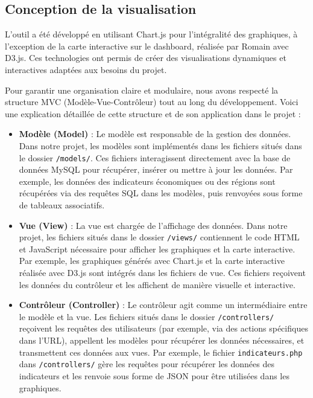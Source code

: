 \documentclass[11pt]{article}
\begin{document}
\subsection{Conception de la visualisation}

L’outil a été développé en utilisant Chart.js pour l'intégralité des graphiques, à l'exception de la carte interactive sur le dashboard, réalisée par Romain avec D3.js. Ces technologies ont permis de créer des visualisations dynamiques et interactives adaptées aux besoins du projet.

Pour garantir une organisation claire et modulaire, nous avons respecté la structure MVC (Modèle-Vue-Contrôleur) tout au long du développement. Voici une explication détaillée de cette structure et de son application dans le projet :

\begin{itemize}
  \item \textbf{Modèle (Model)} : Le modèle est responsable de la gestion des données. Dans notre projet, les modèles sont implémentés dans les fichiers situés dans le dossier \texttt{/models/}. Ces fichiers interagissent directement avec la base de données MySQL pour récupérer, insérer ou mettre à jour les données. Par exemple, les données des indicateurs économiques ou des régions sont récupérées via des requêtes SQL dans les modèles, puis renvoyées sous forme de tableaux associatifs.

  \item \textbf{Vue (View)} : La vue est chargée de l'affichage des données. Dans notre projet, les fichiers situés dans le dossier \texttt{/views/} contiennent le code HTML et JavaScript nécessaire pour afficher les graphiques et la carte interactive. Par exemple, les graphiques générés avec Chart.js et la carte interactive réalisée avec D3.js sont intégrés dans les fichiers de vue. Ces fichiers reçoivent les données du contrôleur et les affichent de manière visuelle et interactive.

  \item \textbf{Contrôleur (Controller)} : Le contrôleur agit comme un intermédiaire entre le modèle et la vue. Les fichiers situés dans le dossier \texttt{/controllers/} reçoivent les requêtes des utilisateurs (par exemple, via des actions spécifiques dans l'URL), appellent les modèles pour récupérer les données nécessaires, et transmettent ces données aux vues. Par exemple, le fichier \texttt{indicateurs.php} dans \texttt{/controllers/} gère les requêtes pour récupérer les données des indicateurs et les renvoie sous forme de JSON pour être utilisées dans les graphiques.
\end{itemize}
\end{document}
